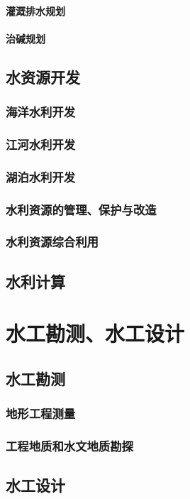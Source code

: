 \documentclass[UTF8]{../../ApplicationUniverse}
\begin{document}
            \paragraph{灌溉排水规划}
            \paragraph{治碱规划}
    \subsection{水资源开发}
        \subsubsection{海洋水利开发}
        \subsubsection{江河水利开发}
        \subsubsection{湖泊水利开发}
        \subsubsection{水利资源的管理、保护与改造}
        \subsubsection{水利资源综合利用}
    \subsection{水利计算}
\section{水工勘测、水工设计}
    \subsection{水工勘测}
        \subsubsection{地形工程测量}
        \subsubsection{工程地质和水文地质勘探}
    \subsection{水工设计}
\end{document}
